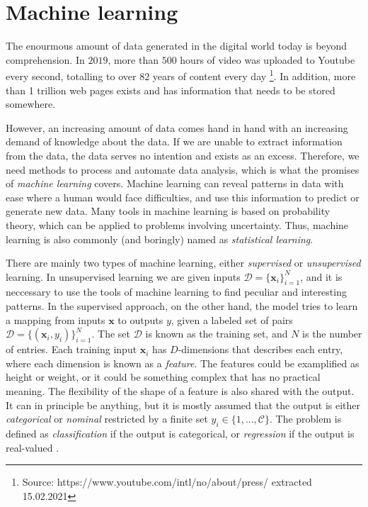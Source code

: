 \chapter{Machine learning}

The enourmous amount of data generated in the digital world today is beyond comprehension. In $2019$, more than $500$ hours of video was uploaded to Youtube every second, totalling to over $82$ years of content every day \footnote{Source: https://www.youtube.com/intl/no/about/press/ extracted 15.02.2021}. In addition, more than 1 trillion web pages exists and has information that needs to be stored somewhere.

However, an increasing amount of data comes hand in hand with an increasing demand of knowledge about the data. If we are unable to extract information from the data, the data serves no intention and exists as an excess. Therefore, we need methods to process and automate data analysis, which is what the promises of \textit{machine learning} covers. Machine learning can reveal patterns in data with ease where a human would face difficulties, and use this information to predict or generate new data. Many tools in machine learning is based on probability theory, which can be applied to problems involving uncertainty. Thus, machine learning is also commonly (and boringly) named as \textit{statistical learning}.

There are mainly two types of machine learning, either \textit{supervised} or \textit{unsupervised} learning. In unsupervised learning we are given inputs $\mathcal{D}=\{\textbf{x}_i\}^N_{i=1}$, and it is neccessary to use the tools of machine learning to find peculiar and interesting patterns. In the supervised approach, on the other hand, the model tries to learn a mapping from inputs $\textbf{x}$ to outputs $y$, given a labeled set of pairs $\mathcal{D}=\{(\textbf{x}_i, y_i)\}^N_{i=1}$. The set $\mathcal{D}$ is known as the training set, and $N$ is the number of entries. Each training input $\textbf{x}_i$ has $D$-dimensions that describes each entry, where each dimension is known as a \textit{feature}. The features could be examplified as height or weight, or it could be something complex that has no practical meaning. The flexibility of the shape of a feature is also shared with the output. It can in principle be anything, but it is mostly assumed that the output is either \textit{categorical} or \textit{nominal} restricted by a finite set $y_i \in \{1,...,\mathcal{C} \}$. The problem is defined as \textit{classification} if the output is categorical, or \textit{regression} if the output is real-valued \cite{Murphy2012}.

